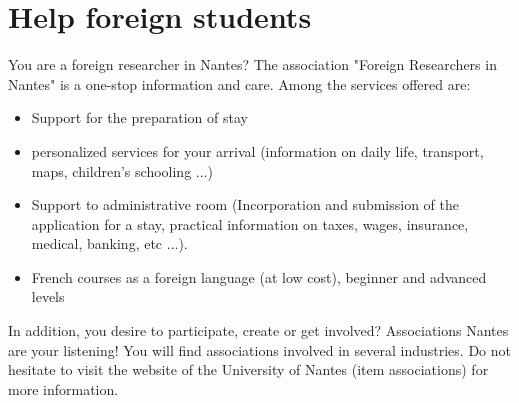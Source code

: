 \section{Help foreign students}
You are a foreign researcher in Nantes?
The association "Foreign Researchers in Nantes" is a one-stop information and care.
Among the services offered are:
\begin{itemize}
   \item Support for the preparation of stay
   \item personalized services for your arrival (information on daily life, transport, maps, children's schooling ...)
   \item Support to administrative room (Incorporation and submission of the application for a stay, practical information on taxes, wages, insurance, medical, banking, etc ...).
   \item French courses as a foreign language (at low cost), beginner and advanced levels
\end{itemize}

In addition, you desire to participate, create or get involved?
Associations Nantes are your listening!
You will find associations involved in several industries.
Do not hesitate to visit the website of the University of Nantes (item associations) for more information.


